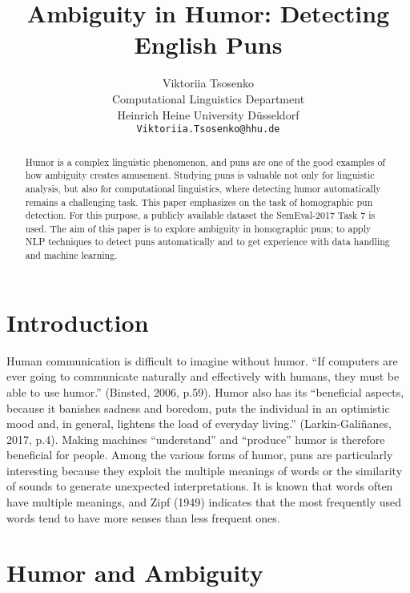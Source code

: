 \documentclass[10pt]{article}
\title{Ambiguity in Humor: Detecting English Puns}
\author{Viktoriia Tsosenko \\
Computational Linguistics Department\\
Heinrich Heine University D\"usseldorf\\
\texttt{Viktoriia.Tsosenko@hhu.de}
		}
\begin{document}
\maketitle

\begin{abstract}
Humor is a complex linguistic phenomenon, and puns are one of the good examples of how ambiguity creates amusement. Studying puns is valuable not only for linguistic analysis, but also for computational linguistics, where detecting humor automatically remains a challenging task. This paper emphasizes on the task of homographic pun detection. For this purpose, a publicly available dataset the SemEval-2017 Task 7 is used. The aim of this paper is to explore ambiguity in homographic puns; to apply NLP techniques to detect puns automatically and to get experience with data handling and machine learning. 
\end{abstract}


\section{Introduction}

Human communication is difficult to imagine without humor. “If computers are ever going to communicate naturally and effectively with humans, they must be able to use humor.” (Binsted, 2006, p.59). Humor also has its “beneficial aspects, because it banishes sadness and boredom, puts the individual in an optimistic mood and, in general, lightens the load of everyday living.” (Larkin-Galiñanes, 2017, p.4). Making machines “understand” and “produce” humor is therefore beneficial for people. Among the various forms of humor, puns are particularly interesting because they exploit the multiple meanings of words or the similarity of sounds to generate unexpected interpretations. It is known that words often have multiple meanings, and Zipf (1949) indicates that the most frequently used words tend to have more senses than less frequent ones. 


\section{Humor and Ambiguity}
\end{document}
